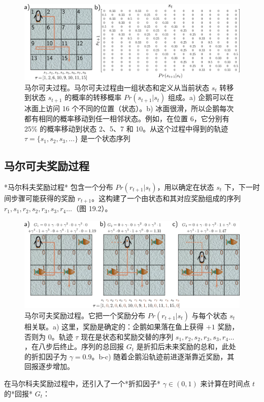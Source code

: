 \begin{figure}[ht!]
\centering
\includegraphics[width=0.7\linewidth]{png/chapter19/ReinforceMDP.png}
\caption{马尔可夫过程。马尔可夫过程由一组状态和定义从当前状态 \(s_t\) 转移到状态 \(s_{t+1}\) 的概率的转移概率 \(Pr(s_{t+1}|s_t)\) 组成。a) 企鹅可以在冰面上访问 16 个不同的位置（状态）。b) 冰面很滑，所以企鹅每次都有相同的概率移动到任一相邻状态。例如，在位置 6，它分别有 25\% 的概率移动到状态 2、5、7 和 10。从这个过程中得到的轨迹 \(\tau = \{s_1, s_2, s_3, \ldots\}\) 是一个状态序列}
\end{figure}

\subsection{马尔可夫奖励过程}
*马尔科夫奖励过程* 包含一个分布 \(Pr(r_{t+1}|s_t)\)，用以确定在状态 \(s_t\) 下，下一时间步骤可能获得的奖励 \(r_{t+1}\)。这构建了一个由状态和其对应奖励组成的序列 \(r_1, s_1, r_2, s_2, r_3, s_3, r_4 \ldots\)（图 19.2）。

\begin{figure}[ht!]
\centering
\includegraphics[width=0.7\linewidth]{png/chapter19/ReinforceMDP2.png}
\caption{马尔可夫奖励过程。它把一个奖励分布 \(Pr(r_{t+1}|s_t)\) 与每个状态 \(s_t\) 相关联。a) 这里，奖励是确定的：企鹅如果落在鱼上获得 \(+1\) 奖励，否则为 \(0\)。轨迹 \(\tau\) 现在是状态和奖励交替的序列 \(s_1, r_2, s_2, r_3, s_3, r_4 \ldots\)，在八步后终止。序列的总回报 \(G_t\) 是折扣后未来奖励的总和，此处的折扣因子为 \(\gamma = 0.9\)。b-c) 随着企鹅沿轨迹前进逐渐靠近奖励，其回报逐步增加。}
\end{figure}

在马尔科夫奖励过程中，还引入了一个*折扣因子* \(\gamma \in (0, 1)\) 来计算在时间点 \(t\) 的*回报* \(G_t\)：

